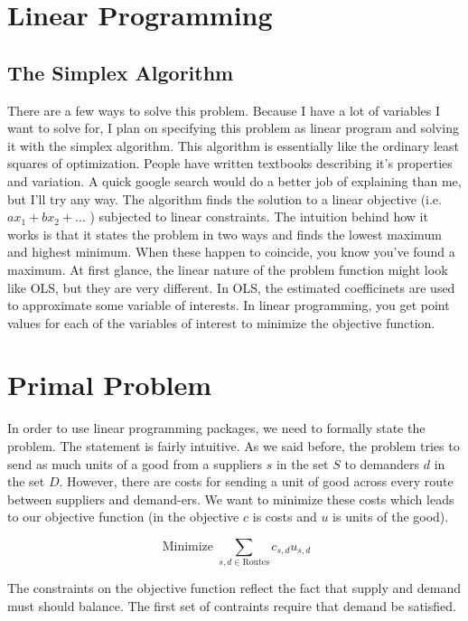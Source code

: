 \documentclass{report}
\begin{document}
\section{Linear Programming}

\subsection{The Simplex Algorithm}

There are a few ways to solve this problem. Because I have a lot of variables I want to solve for, I plan on specifying this problem as linear program and solving it with the simplex algorithm. This algorithm is essentially like the ordinary least squares of optimization. People have written textbooks describing it's properties and variation. A quick google search would do a better job of explaining than me, but I'll try any way. The algorithm finds the solution to a linear objective (i.e. $a x_1 +b x_2 + ...$ ) subjected to linear constraints. The intuition behind how it works is that it states the problem in two ways and finds the lowest maximum and highest minimum. When these happen to coincide,  you know you've found a maximum. At first glance, the  linear nature of the problem function might look like OLS, but they are very different. In OLS, the estimated coefficinets are used to approximate some variable of interests. In linear programming, you get point values for each of the variables of interest to minimize the objective function.

\section{Primal Problem}

In order to use linear programming packages, we need to formally state the problem. The statement is fairly intuitive. As we said before, the problem tries to send as much units of a good from a suppliers $s$ in the set $S$ to demanders $d$ in the set $D$. However, there are costs for sending a unit of good across every route between suppliers and demand-ers. We want to minimize these costs which leads to our objective function (in the objective $c$ is costs and $u$ is units of the good).

$$\operatorname{Minimize} \sum_{s,d \in \text{Routes}} c_{s,d} u_{s,d}$$

The constraints on the objective function reflect the fact that supply and demand must should balance. The first set of contraints require that demand be satisfied.
\end{document}
